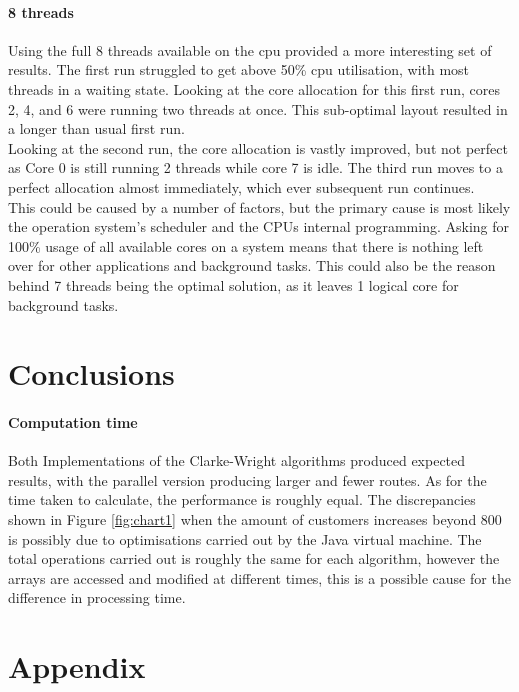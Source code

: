 \documentclass[conference]{acmsiggraph}
\begin{document}
\paragraph{8 threads}
Using the full 8 threads available on the cpu provided a more interesting set of results. The first run struggled to get above 50\% cpu utilisation, with most threads in a waiting state. Looking at the core allocation for this first run, cores 2, 4, and 6 were running two threads at once. This sub-optimal layout resulted in a longer than usual first run. \\
Looking at the second run, the core allocation is vastly improved, but not perfect as Core 0 is still running 2 threads while core 7 is idle.
The third run moves to a perfect allocation almost immediately, which ever subsequent run continues.
\\
This could be caused by a number of factors, but the primary cause is most likely the operation system's scheduler and the CPUs internal programming.
Asking for 100\% usage of all available cores on a system means that there is nothing left over for other applications and background tasks.
This could also be the reason behind 7 threads being the optimal solution, as it leaves 1 logical core for background tasks.

\section{Conclusions}
\paragraph{Computation time}
Both Implementations of the Clarke-Wright algorithms produced expected results, with the parallel version producing larger and fewer routes. As for the time taken to calculate, the performance is roughly equal.
The discrepancies shown in Figure \ref{fig:chart1} when the amount of customers increases beyond 800 is possibly due to optimisations carried out by the Java virtual machine. The total operations carried out is roughly the same for each algorithm, however the arrays are accessed and modified at different times, this is a possible cause for the difference in processing time.



\newpage
\section{Appendix}
\end{document}
